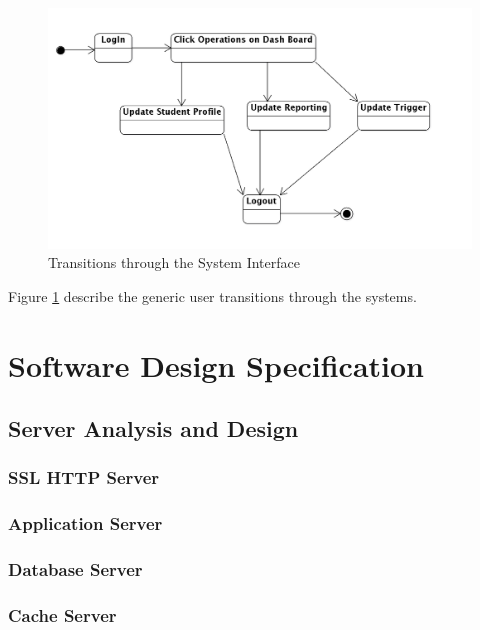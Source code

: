 \documentclass{journal}
\begin{document}
\begin{figure}[htp]                                                             
\centering                                                                      
\includegraphics[scale=0.25]{diagrams/statechart_uc.png}
\caption{Transitions through the System Interface}                              
\label{fig:Transitions}   
\end{figure}                                                                    
             
Figure \ref{fig:Transitions} describe the generic user transitions through the systems. 


\section{Software Design Specification}

\subsection{Server Analysis and Design}
\subsubsection{SSL HTTP Server}

\subsubsection{Application Server}

\subsubsection{Database Server}

\subsubsection{Cache Server}
\end{document}
